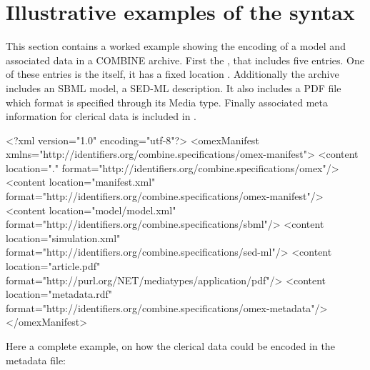 
\section{Illustrative examples of the syntax}
\label{examples}

This section contains a worked example showing the encoding of a model 
and associated data in a COMBINE archive. First the \OmexManifest, that 
includes five entries. One of these entries is the \OmexManifest itself, 
it has a fixed location . Additionally 
the archive includes an SBML model, a SED-ML description. It also 
includes a PDF file which format is specified through its Media type. Finally 
associated meta information for clerical data is included in 
. 


\begin{example}
<?xml version="1.0" encoding="utf-8"?>
<omexManifest xmlns="http://identifiers.org/combine.specifications/omex-manifest">
    <content location="." 
		         format="http://identifiers.org/combine.specifications/omex"/>
    <content location="manifest.xml" 
		         format="http://identifiers.org/combine.specifications/omex-manifest"/>
    <content location="model/model.xml" 
		         format="http://identifiers.org/combine.specifications/sbml"/>
    <content location="simulation.xml" 
		         format="http://identifiers.org/combine.specifications/sed-ml"/>
    <content location="article.pdf" 
		         format="http://purl.org/NET/mediatypes/application/pdf"/>
    <content location="metadata.rdf" 
		         format="http://identifiers.org/combine.specifications/omex-metadata"/>
</omexManifest>
\end{example}

Here a complete example, on how the clerical data could be encoded in the metadata file: 

